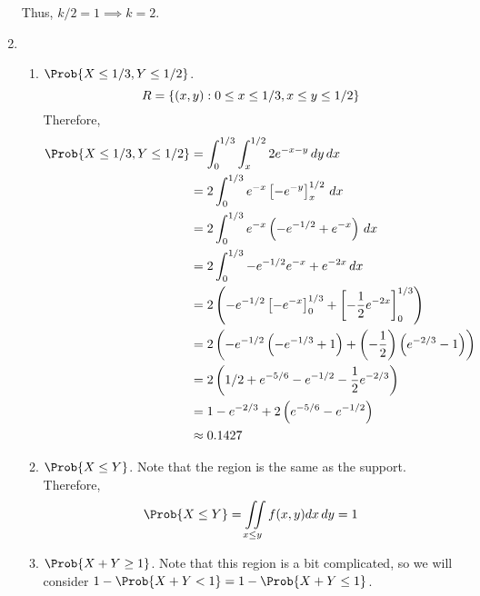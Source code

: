 \begin{Example}{}{}
\begin{enumerate}[label=(\roman*)]
              Thus, $ k/2=1\implies k=2 $.
        \item \begin{enumerate}[label=(\alph*)]
                  \item $ \Prob{X\le 1/3,Y\le 1/2} $.
                        \[ R=\{(x,y):0\le x\le 1/3, x\le y\le 1/2\} \]
                        Therefore,
                        \begin{align*}
                            \Prob{X\le 1/3,Y\le 1/2}
                             & =\int_{0}^{1/3} \int_{x}^{1/2} 2e^{-x-y}\, d{y} \, d{x}                                              \\
                             & =2\int_{0}^{1/3} e^{-x}\left[ -e^{-y} \right]_x^{1/2}\, d{x}                                         \\
                             & =2 \int_{0}^{1/3} e^{-x}\left( -e^{-1/2}+e^{-x} \right)\, d{x}                                       \\
                             & =2 \int_{0}^{1/3} -e^{-1/2}e^{-x}+e^{-2x}\, d{x}                                                     \\
                             & =2\left( -e^{-1/2}\left[ -e^{-x} \right]_0^{1/3}+\left[ -\frac{1}{2} e^{-2x} \right]_0^{1/3} \right) \\
                             & =2\left( -e^{-1/2}\left( -e^{-1/3}+1 \right)+\left( -\frac{1}{2}  \right)
                            \left( e^{-2/3}-1 \right) \right)                                                                       \\
                             & =2\left(1/2+e^{-5/6}-e^{-1/2}-\frac{1}{2}e^{-2/3}\right)                                             \\
                             & =1-e^{-2/3}+2\left(e^{-5/6}-e^{-1/2}\right)                                                          \\
                             & \approx 0.1427
                        \end{align*}
                  \item $ \Prob{X\le Y} $. Note that the region
                        is the same as the support. Therefore,
                        \[ \Prob{X\le Y}
                            =\iint\limits_{x\le y}f(x,y)dx\,dy=1 \]
                  \item $ \Prob{X+Y\ge 1} $. Note that this region is a
                        bit complicated, so we will consider $ 1-\Prob{X+Y<1}
                            =1-\Prob{X+Y\le 1} $.

\end{enumerate}
\end{enumerate}
\end{Example}
